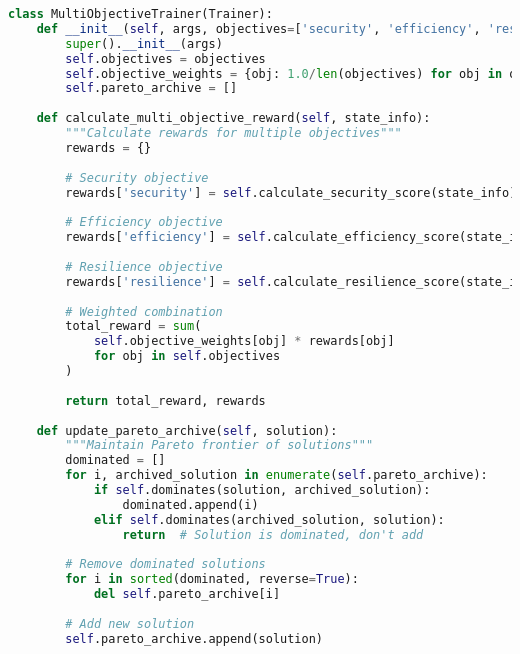 \documentclass[12pt,a4paper]{article}
\begin{document}
\begin{lstlisting}[language=Python, caption=Multi-Objective Framework]
class MultiObjectiveTrainer(Trainer):
    def __init__(self, args, objectives=['security', 'efficiency', 'resilience']):
        super().__init__(args)
        self.objectives = objectives
        self.objective_weights = {obj: 1.0/len(objectives) for obj in objectives}
        self.pareto_archive = []
    
    def calculate_multi_objective_reward(self, state_info):
        """Calculate rewards for multiple objectives"""
        rewards = {}
        
        # Security objective
        rewards['security'] = self.calculate_security_score(state_info)
        
        # Efficiency objective  
        rewards['efficiency'] = self.calculate_efficiency_score(state_info)
        
        # Resilience objective
        rewards['resilience'] = self.calculate_resilience_score(state_info)
        
        # Weighted combination
        total_reward = sum(
            self.objective_weights[obj] * rewards[obj] 
            for obj in self.objectives
        )
        
        return total_reward, rewards
    
    def update_pareto_archive(self, solution):
        """Maintain Pareto frontier of solutions"""
        dominated = []
        for i, archived_solution in enumerate(self.pareto_archive):
            if self.dominates(solution, archived_solution):
                dominated.append(i)
            elif self.dominates(archived_solution, solution):
                return  # Solution is dominated, don't add
        
        # Remove dominated solutions
        for i in sorted(dominated, reverse=True):
            del self.pareto_archive[i]
        
        # Add new solution
        self.pareto_archive.append(solution)
\end{lstlisting}
\end{document}
